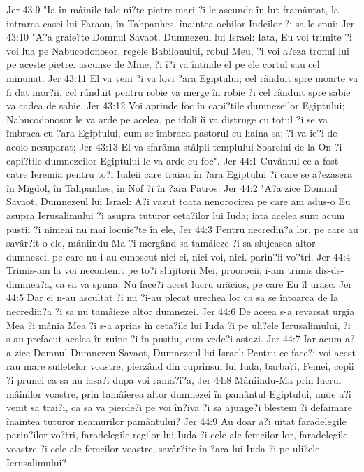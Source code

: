 Jer 43:9  "Ia în mâinile tale ni?te pietre mari ?i le ascunde în lut framântat, la intrarea casei lui Faraon, în Tahpanhes, înaintea ochilor Iudeilor ?i sa le spui:
Jer 43:10  "A?a graie?te Domnul Savaot, Dumnezeul lui Israel: Iata, Eu voi trimite ?i voi lua pe Nabucodonosor. regele Babilonului, robul Meu, ?i voi a?eza tronul lui pe aceste pietre. ascunse de Mine, ?i î?i va întinde el pe ele cortul sau cel minunat.
Jer 43:11  El va veni ?i va lovi ?ara Egiptului; cel rânduit spre moarte va fi dat mor?ii, cel rânduit pentru robie va merge în robie ?i cel rânduit spre sabie va cadea de sabie.
Jer 43:12  Voi aprinde foc în capi?tile dumnezeilor Egiptului; Nabucodonosor le va arde pe acelea, pe idoli îi va distruge cu totul ?i se va îmbraca cu ?ara Egiptului, cum se îmbraca pastorul cu haina sa; ?i va ie?i de acolo nesuparat;
Jer 43:13  El va sfarâma stâlpii templului Soarelui de la On ?i capi?tile dumnezeilor Egiptului le va arde cu foc".
Jer 44:1  Cuvântul ce a fost catre Ieremia pentru to?i Iudeii care traiau în ?ara Egiptului ?i care se a?ezasera în Migdol, în Tahpanhes, în Nof ?i în ?ara Patros:
Jer 44:2  "A?a zice Domnul Savaot, Dumnezeul lui Israel: A?i vazut toata nenorocirea pe care am adus-o Eu asupra Ierusalimului ?i asupra tuturor ceta?ilor lui Iuda; iata acelea sunt acum pustii ?i nimeni nu mai locuie?te în ele,
Jer 44:3  Pentru necredin?a lor, pe care au savâr?it-o ele, mâniindu-Ma ?i mergând sa tamâieze ?i sa slujeasca altor dumnezei, pe care nu i-au cunoscut nici ei, nici voi, nici. parin?ii vo?tri.
Jer 44:4  Trimis-am la voi necontenit pe to?i slujitorii Mei, proorocii; i-am trimis dis-de-diminea?a, ca sa va spuna: Nu face?i acest lucru urâcios, pe care Eu îl urasc.
Jer 44:5  Dar ei n-au ascultat ?i nu ?i-au plecat urechea lor ca sa se întoarca de la necredin?a ?i sa nu tamâieze altor dumnezei.
Jer 44:6  De aceea s-a revarsat urgia Mea ?i mânia Mea ?i s-a aprins în ceta?ile lui Iuda ?i pe uli?ele Ierusalimului, ?i s-au prefacut acelea în ruine ?i în pustiu, cum vede?i astazi.
Jer 44:7  Iar acum a?a zice Domnul Dumnezeu Savaot, Dumnezeul lui Israel: Pentru ce face?i voi acest rau mare sufletelor voastre, pierzând din cuprinsul lui Iuda, barba?i, Femei, copii ?i prunci ca sa nu lasa?i dupa voi rama?i?a,
Jer 44:8  Mâniindu-Ma prin lucrul mâinilor voastre, prin tamâierea altor dumnezei în pamântul Egiptului, unde a?i venit sa trai?i, ca sa va pierde?i pe voi în?iva ?i sa ajunge?i blestem ?i defaimare înaintea tuturor neamurilor pamântului?
Jer 44:9  Au doar a?i uitat faradelegile parin?ilor vo?tri, faradelegile regilor lui Iuda ?i cele ale femeilor lor, faradelegile voastre ?i cele ale femeilor voastre, savâr?ite în ?ara lui Iuda ?i pe uli?ele Ierusalimului?
